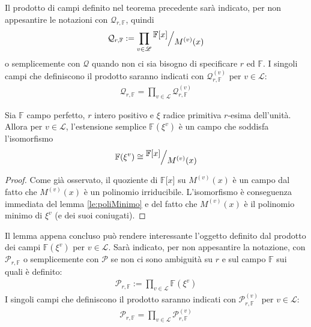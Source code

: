 Il prodotto di campi definito nel teorema precedente sarà indicato, per non appesantire le notazioni con $\mathcal{Q}_{r,\mathbb{F}}$, quindi 
   \begin{align*}
      \mathcal{Q}_{r,\mathbb{F}}
      :=
      \prod_{v\in \mathscr{L}} \quotient{\mathbb{F} \lbrack x \rbrack  }{M^{(v)}(x)}
   \end{align*}
o semplicemente con $\mathcal{Q}$ quando non ci sia bisogno di specificare $r$ ed $\mathbb{F}$. I singoli campi che definiscono il prodotto saranno indicati con $\mathcal{Q}_{r,\mathbb{F}}^{(v)}$ per $v\in \mathscr{L}$:
   \begin{align*}
      \mathcal{Q}_{r,\mathbb{F}}
      =
      \prod_{v\in \mathscr{L}} \mathcal{Q}_{r,\mathbb{F}}^{(v)}
   \end{align*}
\begin{lemmax} \label{le:lemmaIsoMu}
   Sia $\mathbb{F}$ campo perfetto, $r$ intero positivo e $\xi$ radice primitiva $r$-esima dell'unità. Allora per $v \in \mathscr{L}$, l'estensione semplice $\mathbb{F}(\xi^{v})$ è un campo che soddisfa l'isomorfismo 
      \begin{align*}
      \mathbb{F}(\xi^{v})
      \cong
      \quotient{\mathbb{F} \lbrack x \rbrack  }{M^{(v)}(x)}
   \end{align*}
\end{lemmax}
\begin{proof}
   Come già osservato, il quoziente di $\mathbb{F} \lbrack x \rbrack $ su $M^{(v)}(x)$ è un campo dal fatto che $M^{(v)}(x)$ è un polinomio irriducibile. L'isomorfismo è conseguenza immediata del lemma \ref{le:poliMinimo} e del fatto che $M^{(v)}(x)$ è il polinomio minimo di $\xi^{v}$ (e dei suoi coniugati).
\end{proof}
Il lemma appena concluso può rendere interessante l'oggetto definito dal prodotto dei campi $\mathbb{F}(\xi^{v})$ per $v \in \mathscr{L}$. Sarà indicato, per non appesantire la notazione, con $\mathcal{P}_{r,\mathbb{F}}$ o semplicemente con $\mathcal{P}$ se non ci sono ambiguità su $r$ e sul campo $\mathbb{F}$ sui quali è definito:
\begin{align*}
   \mathcal{P}_{r,\mathbb{F}} :=  \prod_{v\in \mathscr{L}} \mathbb{F}(\xi^{v})
\end{align*}
I singoli campi che definiscono il prodotto saranno indicati con $\mathcal{P}_{r,\mathbb{F}}^{(v)}$ per $v\in \mathscr{L}$:
   \begin{align*}
      \mathcal{P}_{r,\mathbb{F}}
      =
      \prod_{v\in \mathscr{L}} \mathcal{P}_{r,\mathbb{F}}^{(v)}
   \end{align*}
   
